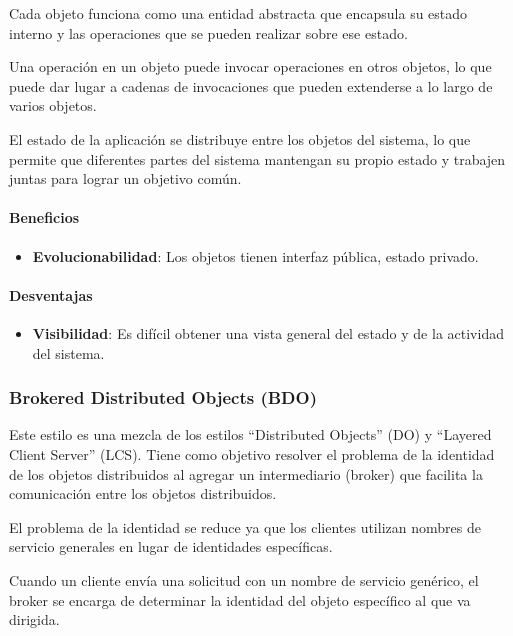 \documentclass{article}
\begin{document}
	 		Cada objeto funciona como una entidad abstracta que encapsula su estado interno y las operaciones que se pueden realizar sobre ese estado. 
	 		
	 		Una operación en un objeto puede invocar operaciones en otros objetos, lo que puede dar lugar a cadenas de invocaciones que pueden extenderse a lo largo de varios objetos.
	 		
	 		El estado de la aplicación se distribuye entre los objetos del sistema, lo que permite que diferentes partes del sistema mantengan su propio estado y trabajen juntas para lograr un objetivo común.
	 		
			\paragraph{Beneficios}
				\begin{itemize}	
					\item {\textbf{Evolucionabilidad}}: Los objetos tienen interfaz pública, estado privado.
				
					
				\end{itemize}
			
			\paragraph{Desventajas}
				\begin{itemize}	
					
					\item {\textbf{Visibilidad}}: Es difícil obtener una vista general del estado y de la
					actividad del sistema.
					
				\end{itemize}
			
			\subsubsection{Brokered Distributed Objects (BDO)}
			
			Este estilo es una mezcla de los estilos ``Distributed Objects'' (DO) y ``Layered Client Server'' (LCS). Tiene como objetivo resolver el problema de la identidad de los objetos distribuidos al agregar un intermediario (broker) que facilita la comunicación entre los objetos distribuidos.
			
			
			El problema de la identidad se reduce ya que los clientes utilizan nombres de servicio generales en lugar de identidades específicas.
			
			Cuando un cliente envía una solicitud con un nombre de servicio genérico, el broker se encarga de determinar la identidad del objeto específico al que va dirigida.
			
\end{document}
